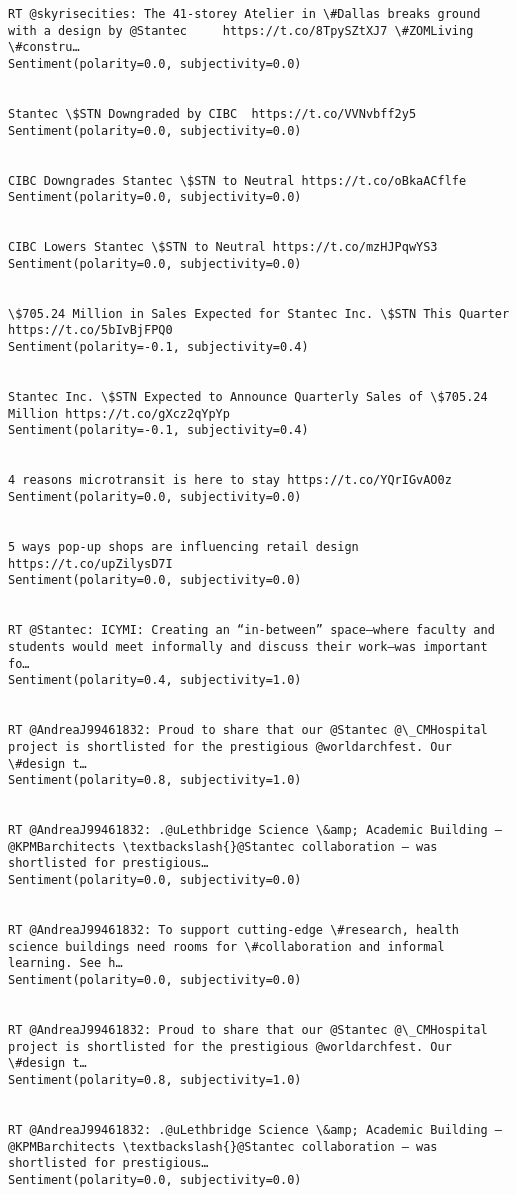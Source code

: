 \documentclass[11pt]{article}
\begin{document}
\begin{Verbatim}[commandchars=\\\{\}]
RT @skyrisecities: The 41-storey Atelier in \#Dallas breaks ground with a design by @Stantec     https://t.co/8TpySZtXJ7 \#ZOMLiving \#constru…
Sentiment(polarity=0.0, subjectivity=0.0)


Stantec \$STN Downgraded by CIBC  https://t.co/VVNvbff2y5
Sentiment(polarity=0.0, subjectivity=0.0)


CIBC Downgrades Stantec \$STN to Neutral https://t.co/oBkaACflfe
Sentiment(polarity=0.0, subjectivity=0.0)


CIBC Lowers Stantec \$STN to Neutral https://t.co/mzHJPqwYS3
Sentiment(polarity=0.0, subjectivity=0.0)


\$705.24 Million in Sales Expected for Stantec Inc. \$STN This Quarter https://t.co/5bIvBjFPQ0
Sentiment(polarity=-0.1, subjectivity=0.4)


Stantec Inc. \$STN Expected to Announce Quarterly Sales of \$705.24 Million https://t.co/gXcz2qYpYp
Sentiment(polarity=-0.1, subjectivity=0.4)


4 reasons microtransit is here to stay https://t.co/YQrIGvAO0z
Sentiment(polarity=0.0, subjectivity=0.0)


5 ways pop-up shops are influencing retail design https://t.co/upZilysD7I
Sentiment(polarity=0.0, subjectivity=0.0)


RT @Stantec: ICYMI: Creating an “in-between” space—where faculty and students would meet informally and discuss their work—was important fo…
Sentiment(polarity=0.4, subjectivity=1.0)


RT @AndreaJ99461832: Proud to share that our @Stantec @\_CMHospital project is shortlisted for the prestigious @worldarchfest. Our \#design t…
Sentiment(polarity=0.8, subjectivity=1.0)


RT @AndreaJ99461832: .@uLethbridge Science \&amp; Academic Building – @KPMBarchitects \textbackslash{}@Stantec collaboration – was shortlisted for prestigious…
Sentiment(polarity=0.0, subjectivity=0.0)


RT @AndreaJ99461832: To support cutting-edge \#research, health science buildings need rooms for \#collaboration and informal learning. See h…
Sentiment(polarity=0.0, subjectivity=0.0)


RT @AndreaJ99461832: Proud to share that our @Stantec @\_CMHospital project is shortlisted for the prestigious @worldarchfest. Our \#design t…
Sentiment(polarity=0.8, subjectivity=1.0)


RT @AndreaJ99461832: .@uLethbridge Science \&amp; Academic Building – @KPMBarchitects \textbackslash{}@Stantec collaboration – was shortlisted for prestigious…
Sentiment(polarity=0.0, subjectivity=0.0)



\end{Verbatim}
\end{document}
